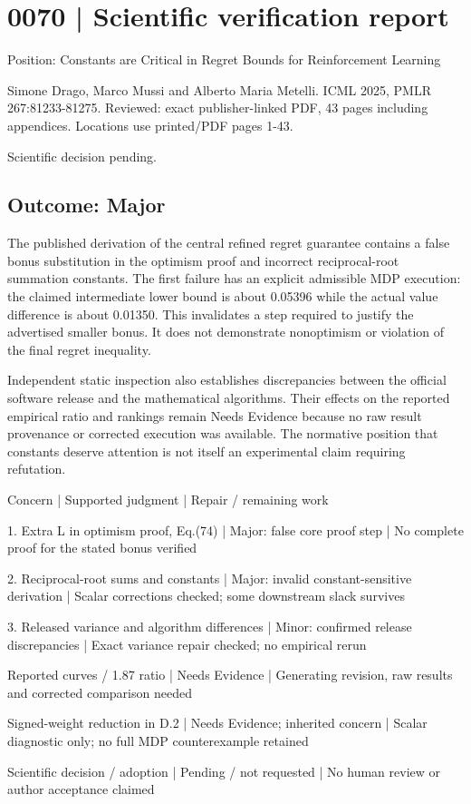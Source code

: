 \documentclass[10pt]{article}
\begin{document}
\section*{0070 | Scientific verification report}
Position: Constants are Critical in Regret Bounds for Reinforcement Learning\par
Simone Drago, Marco Mussi and Alberto Maria Metelli. ICML 2025, PMLR 267:81233-81275. Reviewed: exact publisher-linked PDF, 43 pages including appendices. Locations use printed/PDF pages 1-43.\par
Scientific decision pending.\par
\subsection*{Outcome: Major}
The published derivation of the central refined regret guarantee contains a false bonus substitution in the optimism proof and incorrect reciprocal-root summation constants. The first failure has an explicit admissible MDP execution: the claimed intermediate lower bound is about 0.05396 while the actual value difference is about 0.01350. This invalidates a step required to justify the advertised smaller bonus. It does not demonstrate nonoptimism or violation of the final regret inequality.\par
Independent static inspection also establishes discrepancies between the official software release and the mathematical algorithms. Their effects on the reported empirical ratio and rankings remain Needs Evidence because no raw result provenance or corrected execution was available. The normative position that constants deserve attention is not itself an experimental claim requiring refutation.\par
Concern | Supported judgment | Repair / remaining work\par
1. Extra L in optimism proof, Eq.(74) | Major: false core proof step | No complete proof for the stated bonus verified\par
2. Reciprocal-root sums and constants | Major: invalid constant-sensitive derivation | Scalar corrections checked; some downstream slack survives\par
3. Released variance and algorithm differences | Minor: confirmed release discrepancies | Exact variance repair checked; no empirical rerun\par
Reported curves / 1.87 ratio | Needs Evidence | Generating revision, raw results and corrected comparison needed\par
Signed-weight reduction in D.2 | Needs Evidence; inherited concern | Scalar diagnostic only; no full MDP counterexample retained\par
Scientific decision / adoption | Pending / not requested | No human review or author acceptance claimed\par
\end{document}
